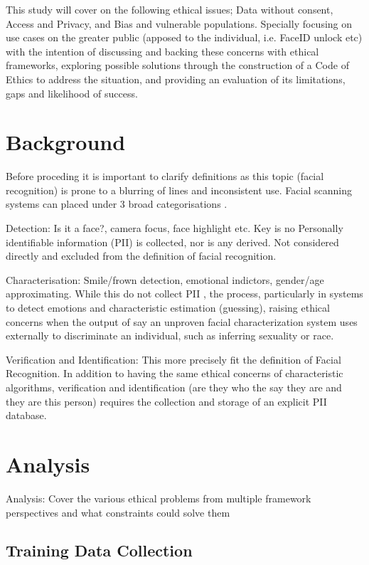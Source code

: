 \documentclass[11pt]{article}
\begin{document}
This study will cover on the following ethical issues; Data without consent, Access and Privacy, and Bias and vulnerable populations. Specially focusing on use cases on the greater public (apposed to the individual, i.e. FaceID unlock etc) with the intention of discussing and backing these concerns with ethical frameworks, exploring possible solutions through the construction of a Code of Ethics to address the situation, and providing an evaluation of its limitations, gaps and likelihood of success. 

\section{Background}
Before proceding it is important to clarify definitions as this topic (facial recognition) is prone to a blurring of lines and inconsistent use. Facial scanning systems can placed under 3 broad categorisations \cite{ethics_book}. 

Detection: Is it a face?, camera focus, face highlight etc. Key is no Personally identifiable information (PII) is collected, nor is any derived. Not considered directly and excluded from the definition of facial recognition.

Characterisation: Smile/frown detection, emotional indictors, gender/age approximating. While this do not collect PII , the process, particularly in systems to detect emotions and characteristic estimation (guessing), raising ethical concerns when the output of say an unproven facial characterization system uses externally to discriminate an individual, such as
inferring sexuality or race.

Verification and Identification: This more precisely fit the definition of Facial Recognition. In addition to having the same ethical concerns of characteristic algorithms, verification and identification (are they who the say they are and they are this person) requires the collection and storage of an explicit PII database.



\section{Analysis}
Analysis: Cover the various ethical problems from multiple framework perspectives and what constraints could solve them

\subsection{Training Data Collection} 
\cite{nature_main}
\end{document}
